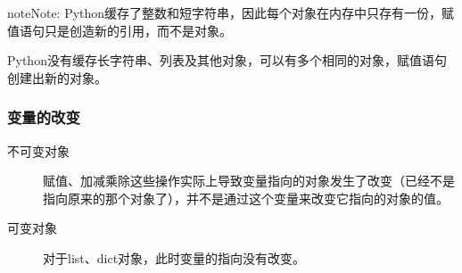 \documentclass[letterpaper,10pt,english]{sphinxmanual}
\begin{document}
\begin{sphinxadmonition}{note}{Note:}
Python缓存了整数和短字符串，因此每个对象在内存中只存有一份，赋值语句只是创造新的引用，而不是对象。

Python没有缓存长字符串、列表及其他对象，可以有多个相同的对象，赋值语句创建出新的对象。
\end{sphinxadmonition}


\subsubsection{变量的改变}
\label{\detokenize{python/15_memManage:id3}}\begin{description}
\item[{不可变对象}] \leavevmode
赋值、加减乘除这些操作实际上导致变量指向的对象发生了改变（已经不是指向原来的那个对象了），并不是通过这个变量来改变它指向的对象的值。

\end{description}

%
\begin{sphinxVerbatim}[commandchars=\\\{\},numbers=left,firstnumber=1,stepnumber=1]
  
    
  
\end{sphinxVerbatim}
\begin{description}
\item[{可变对象}] \leavevmode
对于list、dict对象，此时变量的指向没有改变。

\end{description}

%
\begin{sphinxVerbatim}[commandchars=\\\{\},numbers=left,firstnumber=1,stepnumber=1]
  \PYG{p}{[}\PYG{p}{]}
\end{sphinxVerbatim}
\end{document}
